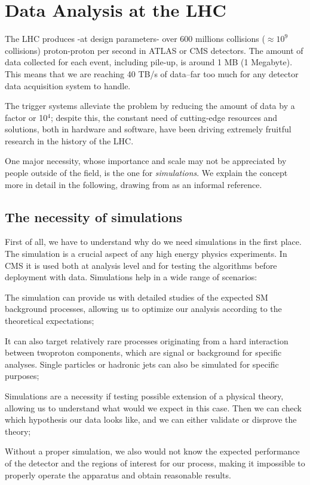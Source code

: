 \chapter{Data Analysis at the LHC}\label{ch:introduction}
The LHC produces -at design parameters- over 600 millions collisions ($\approx 10^9$ collisions) proton-proton per second in ATLAS or CMS detectors. The amount of data collected for each event, including pile-up, is around 1 MB (1 Megabyte). This means that we are reaching 40 TB/s of data--far too much for any detector data acquisition system to handle.

The trigger systems alleviate the problem by reducing the amount of data by a factor or 10$^{4}$; despite this, the constant need of cutting-edge resources and solutions, both in hardware and software, have been driving extremely fruitful research in the history of the LHC.

One major necessity, whose importance and scale may not be appreciated by people outside of the field, is the one for \emph{simulations}. We explain the concept more in detail in the following, drawing from \cite{sims} as an informal reference.

\section{The necessity of simulations}

First of all, we have to understand why do we need simulations in the first place.
The simulation is a crucial aspect of any high energy physics experiments. In CMS it is used both
at analysis level and for testing the algorithms before deployment with data. 
Simulations help in a wide range of scenarios:

\begin{outline}
   \1  The simulation can provide us with detailed studies of the expected SM background processes, allowing us to optimize our analysis according to the theoretical expectations;

\1 It can also target relatively rare processes originating from a hard interaction between twoproton components, which are signal or background for specific analyses. Single particles
or hadronic jets can also be simulated for specific purposes;

\1 Simulations are a necessity if testing possible extension of a physical theory, allowing us to understand what would we expect in this case. Then we can check which hypothesis our data looks like, and we can either validate or disprove the theory;

\1 Without a proper simulation, we also would not know the expected performance of the detector and the regions of interest for our process, making it impossible to properly operate the apparatus and obtain reasonable results.
\end{outline}

